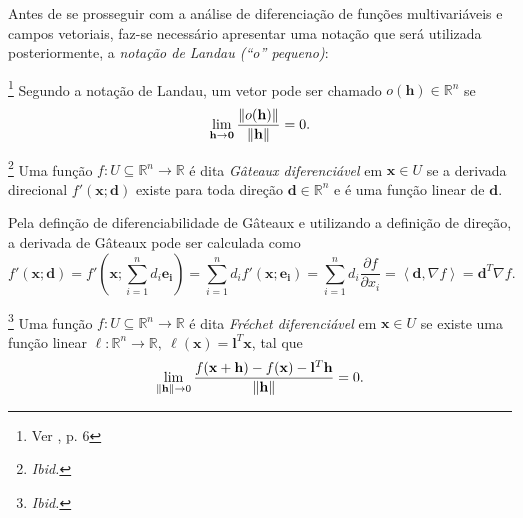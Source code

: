 Antes de se prosseguir com a an\'{a}lise de diferencia\c{c}\~{a}o de fun\c{c}\~{o}es multivari\'{a}veis e campos vetoriais, faz-se necess\'{a}rio apresentar uma nota\c{c}\~{a}o que ser\'{a} utilizada posteriormente, a \textit{nota\c{c}\~{a}o de Landau (``o'' pequeno)}:

\begin{definition}\footnote{Ver \cite{guller}, p. 6}
Segundo a nota\c{c}\~{a}o de Landau, um vetor pode ser chamado $o(\mathbf{h}) \in \mathbb{R}^{n}$ se
\begin{equation*}
\lim_{\mathbf{h} \to \mathbf{0}} \frac{\left\lVert o(\mathbf{h})\right\rVert}{\left\lVert\mathbf{h}\right\rVert} = 0.
\end{equation*}
\end{definition}

\begin{definition}\label{gateauxDef}\footnote{\textit{Ibid.}}
Uma fun\c{c}\~{a}o $f: U \subseteq \mathbb{R}^{n} \to \mathbb{R}$ \'{e} dita \textit{G\^{a}teaux diferenci\'{a}vel} em $\mathbf{x} \in U$ se a derivada direcional $f'(\mathbf{x};\mathbf{d})$ existe para toda dire\c{c}\~{a}o $\mathbf{d} \in \mathbb{R}^{n}$ e \'{e} uma fun\c{c}\~{a}o linear de $\mathbf{d}$.
\end{definition}

Pela defin\c{c}\~{a}o de diferenciabilidade de G\^{a}teaux e utilizando a defini\c{c}\~{a}o de dire\c{c}\~{a}o, a derivada de G\^{a}teaux pode ser calculada como
\begin{equation}\label{gateauxCalc}
f'(\mathbf{x};\mathbf{d}) = f'(\mathbf{x};\sum_{i=1}^{n}d_i\mathbf{e_i}) = \sum_{i=1}^{n} d_i f'(\mathbf{x};\mathbf{e_i}) = \sum_{i = 1}^{n} d_i \frac{\partial f}{\partial x_i} = \left\langle \mathbf{d},\nabla f \right\rangle = \mathbf{d}^T \nabla f.
\end{equation}

\begin{definition}\label{frechetDef}\footnote{\textit{Ibid.}}
Uma fun\c{c}\~{a}o $f: U \subseteq \mathbb{R}^{n} \to \mathbb{R}$ \'{e} dita \textit{Fr\'{e}chet diferenci\'{a}vel} em $\mathbf{x} \in U$ se existe uma fun\c{c}\~{a}o linear $\ell: \mathbb{R}^{n} \to \mathbb{R},~\ell(\mathbf{x}) = \mathbf{l}^T\mathbf{x}$, tal que
\begin{equation*}
\lim_{\left\lVert\mathbf{h}\right\rVert \to 0} \frac{f(\mathbf{x} + \mathbf{h}) - f(\mathbf{x}) - \mathbf{l}^T\mathbf{h}}{\left\lVert\mathbf{h}\right\rVert} = 0.
\end{equation*}
\end{definition}

